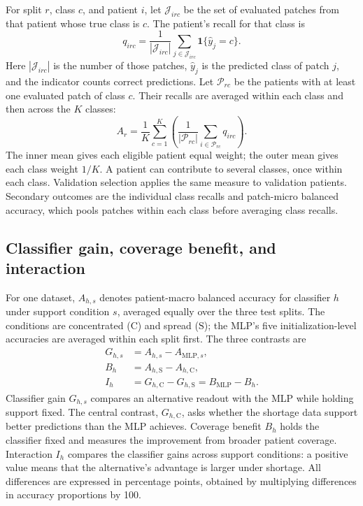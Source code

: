 \documentclass[11pt]{article}
\newcommand{\conc}{\mathrm{C}}
\newcommand{\spr}{\mathrm{S}}
\begin{document}
For split \(r\), class \(c\), and patient \(i\), let \(\mathcal{J}_{irc}\) be the set of evaluated patches from that patient whose true class is \(c\). The patient's recall for that class is
\begin{equation}
q_{irc}=\frac{1}{|\mathcal{J}_{irc}|}
\sum_{j\in\mathcal{J}_{irc}}\mathbf{1}\{\widehat y_j=c\}.
\label{eq:patient-recall}
\end{equation}
\noindent Here \(|\mathcal{J}_{irc}|\) is the number of those patches, \(\widehat y_j\) is the predicted class of patch \(j\), and the indicator counts correct predictions. Let \(\mathcal{P}_{rc}\) be the patients with at least one evaluated patch of class \(c\). Their recalls are averaged within each class and then across the \(K\) classes:
\begin{equation}
A_r=\frac{1}{K}\sum_{c=1}^{K}
\left(\frac{1}{|\mathcal{P}_{rc}|}\sum_{i\in\mathcal{P}_{rc}}q_{irc}\right).
\label{eq:ba}
\end{equation}
\noindent The inner mean gives each eligible patient equal weight; the outer mean gives each class weight \(1/K\). A patient can contribute to several classes, once within each class. Validation selection applies the same measure to validation patients. Secondary outcomes are the individual class recalls and patch-micro balanced accuracy, which pools patches within each class before averaging class recalls.

\subsection{Classifier gain, coverage benefit, and interaction}
For one dataset, \(A_{h,s}\) denotes patient-macro balanced accuracy for classifier \(h\) under support condition \(s\), averaged equally over the three test splits. The conditions are concentrated (\(\conc\)) and spread (\(\spr\)); the MLP's five initialization-level accuracies are averaged within each split first. The three contrasts are
\begin{align}
G_{h,s}&=A_{h,s}-A_{\mathrm{MLP},s},\label{eq:gain}\\
B_h&=A_{h,\spr}-A_{h,\conc},\label{eq:breadth}\\
I_h&=G_{h,\conc}-G_{h,\spr}=B_{\mathrm{MLP}}-B_h.
\label{eq:interaction}
\end{align}
\noindent Classifier gain \(G_{h,s}\) compares an alternative readout with the MLP while holding support fixed. The central contrast, \(G_{h,\conc}\), asks whether the shortage data support better predictions than the MLP achieves. Coverage benefit \(B_h\) holds the classifier fixed and measures the improvement from broader patient coverage. Interaction \(I_h\) compares the classifier gains across support conditions: a positive value means that the alternative's advantage is larger under shortage. All differences are expressed in percentage points, obtained by multiplying differences in accuracy proportions by 100.
\end{document}
